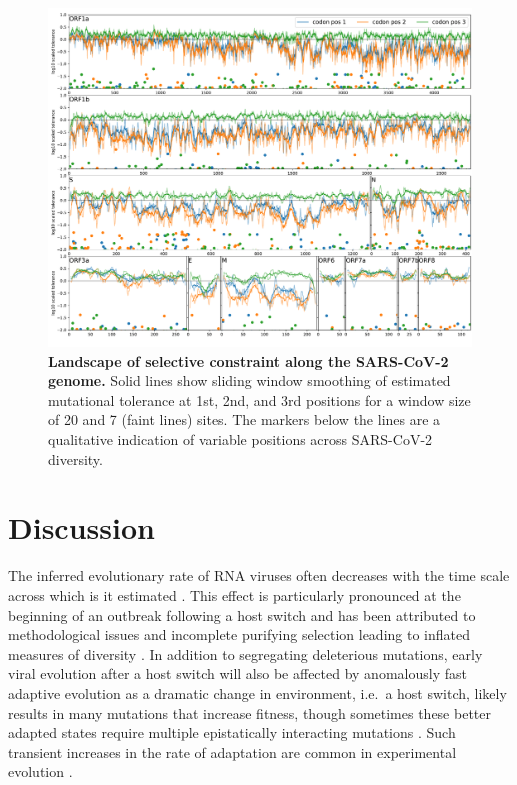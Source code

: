 \documentclass[aps,rmp, twocolumn]{revtex4}
\begin{document}
 \begin{figure}[tb]
    \includegraphics[width=\textwidth]{figures/fitness_landscape.pdf}
    \caption{{\bf Landscape of selective constraint along the SARS-CoV-2 genome.}
    Solid lines show sliding window smoothing of estimated mutational tolerance at 1st, 2nd, and 3rd positions for a window size of 20 and 7 (faint lines) sites.
    The markers below the lines are a qualitative indication of variable positions across SARS-CoV-2 diversity.
    \label{fig:fitness_landscape}}
 \end{figure}

\section*{Discussion}
The inferred evolutionary rate of RNA viruses often decreases with the time scale across which is it estimated \citep{wertheim_purifying_2011,ghafari_prisoner_2021}.
This effect is particularly pronounced at the beginning of an outbreak following a host switch and has been attributed to methodological issues and incomplete purifying selection leading to inflated measures of diversity \citep{meyer_time_2015,ghafari_purifying_2022}.
In addition to segregating deleterious mutations, early viral evolution after a host switch will also be affected by anomalously fast adaptive evolution as a dramatic change in environment, i.e.~a host switch, likely results in many mutations that increase fitness, though sometimes these better adapted states require multiple epistatically interacting mutations \citep{martin_emergence_2021}.
Such transient increases in the rate of adaptation are common in experimental evolution \citep{elena_virus_2007}.
\end{document}
